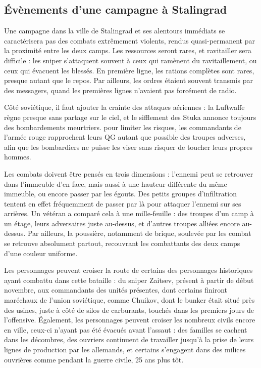 \documentclass{report}
\begin{document}
\begin{multicols}{2}
\subsection{Évènements d'une campagne à Stalingrad}
Une campagne dans la ville de Stalingrad et ses alentours immédiats se caractérisera pas des combats extrêmement violents, rendus quasi-permanent par la proximité entre les deux camps. Les ressources seront rares, et ravitailler sera difficile : les sniper s'attaquent souvent à ceux qui ramènent du ravitaillement, ou ceux qui évacuent les blessés. En première ligne, les rations complètes sont rares, presque autant que le repos. Par ailleurs, les ordres étaient souvent transmis par des messagers, quand les premières lignes n'avaient pas forcément de radio.

Côté soviétique, il faut ajouter la crainte des attaques aériennes : la Luftwaffe règne presque sans partage sur le ciel, et le sifflement des Stuka annonce toujours des bombardements meurtriers. pour limiter les risques, les commandants de l'armée rouge rapprochent leurs QG autant que possible des troupes adverses, afin que les bombardiers ne puisse les viser sans risquer de toucher leurs propres hommes.

Les combats doivent être pensés en trois dimensions : l'ennemi peut se retrouver dans l'immeuble d'en face, mais aussi à une hauteur différente du même immeuble, ou encore passer par les égouts. Des petits groupes d'infiltration tentent en effet fréquemment de passer par là pour attaquer l'ennemi sur ses arrières. Un vétéran a comparé cela à une mille-feuille : des troupes d'un camp à un étage, leurs adversaires juste au-dessus, et d'autres troupes alliées encore au-dessus. Par ailleurs, la poussière, notamment de brique, soulevée par les combat se retrouve absolument partout, recouvrant les combattants des deux camps d'une couleur uniforme.

Les personnages peuvent croiser la route de certains des personnages historiques ayant combattu dans cette bataille : du sniper Zaitsev, présent à partir de début novembre, aux commandants des unités présentes, dont certains finiront maréchaux de l'union soviétique, comme Chuikov, dont le bunker était situé près des usines, juste à côté de silos de carburants, touchés dans les premiers jours de l'offensive. Également, les personnages peuvent croiser les nombreux civils encore en ville, ceux-ci n'ayant pas été évacués avant l'assaut : des familles se cachent dans les décombres, des ouvriers continuent de travailler jusqu'à la prise de leurs lignes de production par les allemands, et certains s'engagent dans des milices ouvrières comme pendant la guerre civile, 25 ans plus tôt.


\end{multicols}
\end{document}
